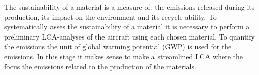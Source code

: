 The sustainability of a material is a measure of: the emissions released during its production, its impact on the environment and its recycle-ability.  
To systematically asses the sustainability of a material it is necessary to perform a preliminary LCA-analyses of the aircraft using each chosen material. To quantify the emissions the unit of global warming potential (GWP) is used for the emissions. In this stage it makes sense to make a streamlined LCA where the focus the emissions related to the production of the materials.

